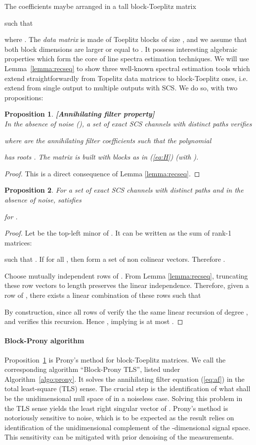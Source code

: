 \documentclass[journal,10pt]{IEEEtran}
\newtheorem{proposition}{Proposition}
\begin{document}
The coefficients  maybe arranged in a tall block-Toeplitz matrix 

 such that

where . The \emph{data matrix}  is made of  Toeplitz blocks of size , and we assume that both block dimensions are larger or equal to . It possess interesting algebraic properties which form the core of line spectra estimation techniques. We will use Lemma~\ref{lemma:recseq} to show three well-known spectral estimation tools which extend straightforwardly from Topelitz data matrices to block-Toeplitz ones, i.e. extend from single output to multiple outputs with SCS. We do so, with two propositions:
\begin{proposition}\label{prop:af}\textbf{[Annihilating filter property]}\\
In the absence of noise (), a set of exact SCS channels with  distinct paths verifies

where  are the annihilating filter coefficients such that the polynomial

has  roots . The matrix  is built with blocks as in (\ref{eq:H}) (with ).
\end{proposition}
\begin{proof}
This is a direct consequence of Lemma \ref{lemma:recseq}.
\end{proof}
\begin{proposition}\label{prop:lr}
For a set of exact SCS channels with  distinct paths and in the absence of noise,  satisfies

for .
\end{proposition}
\begin{proof}
Let  be the top-left  minor of . It can be written as the sum of  rank-1 matrices:

such that . If  for all , then  form a set of non colinear vectors. Therefore  .

Choose  mutually independent rows of . From  Lemma \ref{lemma:recseq}, truncating these row vectors to length  preserves the linear independence. Therefore, given a row  of , there exists a linear combination of these  rows  such that

By construction, since all rows of  verify the the same linear recursion of degree ,  and  verifies this recursion. Hence , implying  is at most .
\end{proof}
\paragraph{Block-Prony algorithm} 
Proposition~\ref{prop:af} is Prony's method \cite{Prony1795,Tufts1982} for block-Toeplitz matrices.
We call the corresponding algorithm ``Block-Prony TLS'', listed under Algorithm~\ref{algo:prony}. It solves the annihilating filter equation (\ref{eq:af}) in the total least-square (TLS) sense. The crucial step is the identification of what shall be the unidimensional null space of  in a noiseless case. Solving this problem in the TLS sense yields the least right singular vector of . Prony's method is notoriously sensitive to noise, which is to be expected as the result relies on identification of the unidimensional complement of the -dimensional signal space. This sensitivity can be mitigated with prior denoising of the measurements.
\end{document}
